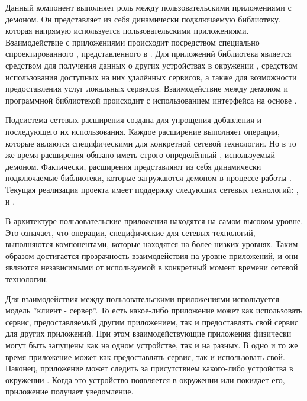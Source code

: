 %
Данный компонент выполняет роль  между пользовательскими приложениями с демоном.
%
Он представляет из себя динамически подключаемую библиотеку, которая напрямую используется пользовательскими приложениями.
%
Взаимодействие с приложениями происходит посредством специально спроектированного , представленного в .
%
Для приложений библиотека является средством для получения данных о других устройствах в окружении , средством использования доступных на них удалённых сервисов, а также для возможности предоставления услуг локальных сервисов.
%
Взаимодействие между демоном и программной библиотекой происходит с использованием интерфейса на основе  .

%
Подсистема сетевых расширения создана для упрощения добавления  и последующего их использования.
%
Каждое расширение выполняет операции, которые являются специфическими для конкретной сетевой технологии.
%
Но в то же время расширения обязано иметь строго определённый , используемый демоном.
%
Фактически, расширения представляют из себя динамически подключаемые библиотеки, которые загружаются демоном в процессе работы .
%
Текущая реализация проекта имеет поддержку следующих сетевых технологий:  ,   и  .

%
В архитектуре  пользовательские приложения находятся на самом высоком уровне.
%
Это означает, что операции, специфические для сетевых технологий, выполняются компонентами, которые находятся на более низких уровнях.
%
Таким образом достигается прозрачность взаимодействия на уровне приложений, и они являются независимыми от используемой в конкретный момент времени сетевой технологии.

%
Для взаимодействия между пользовательскими приложениями используется модель ''клиент - сервер''.
%
То есть какое-либо приложение может как использовать сервис, предоставляемый другим приложением, так и предоставлять свой сервис для других приложений. 
%
При этом взаимодействующие приложения физически могут быть запущены как на одном устройстве, так и на разных. 
%
В одно и то же время приложение может как предоставлять сервис, так и использовать свой.
%
Наконец, приложение может следить за присутствием какого-либо устройства в окружении .
%
Когда это устройство появляется в окружении или покидает его, приложение получает уведомление.